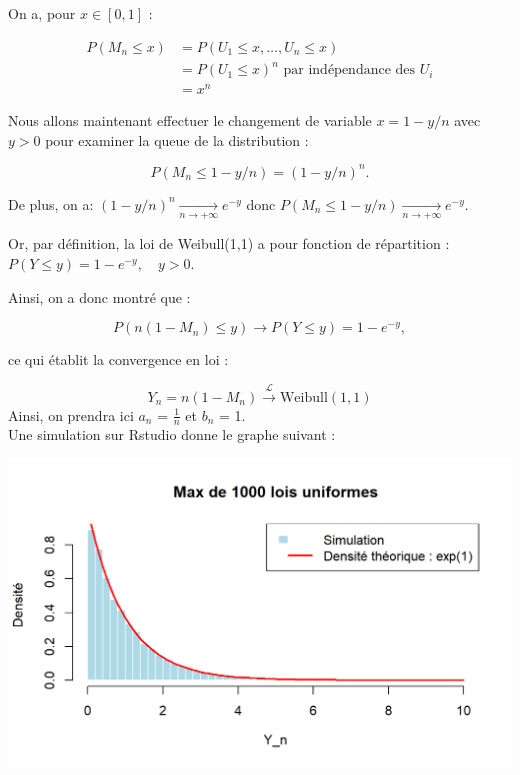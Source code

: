 \documentclass{article}
\theoremstyle{plain}
\theoremstyle{definition}
\theoremstyle{plain}
\begin{document}
\noindent On a, pour $ x \in [0,1]$ :

\begin{align*}
	P(M_n \leq x) &= P(U_1 \leq x, \dots, U_n \leq x) \\
	&= P(U_1 \leq x)^n \text{ par indépendance des $U_i$}\\
	&= x^n
\end{align*}

\noindent Nous allons maintenant effectuer le changement de variable $ x = 1 - y/n $ avec $y > 0 $ pour examiner la queue de la distribution :

\[
P(M_n \leq 1 - y/n) = (1 - y/n)^n.
\]

\noindent De plus, on a: $(1 - y/n)^n \xrightarrow[n \to +\infty]{} e^{-y} $ donc $ P(M_n \leq 1 - y/n) \xrightarrow[n \to +\infty]{} e^{-y} $.


\noindent Or, par définition, la loi de Weibull(1,1) a pour fonction de répartition : $ P(Y \leq y) = 1 - e^{-y}, \quad y > 0. $

\noindent Ainsi, on a donc montré que :

\[
P(n(1 - M_n) \leq y) \to P(Y \leq y) = 1 - e^{-y},
\]

\noindent ce qui établit la convergence en loi :

\[
Y_n = n(1 - M_n) \xrightarrow{\mathcal{L}} \text{Weibull}(1,1)
\] 
\noindent Ainsi, on prendra ici $a_n$ = $\frac{1}{n}$ et $b_n$ = 1. \\

\noindent Une simulation sur Rstudio donne le graphe suivant :

\begin{center}
	\includegraphics[scale=0.8]{./images/Max_Uniforme.png} 
\end{center}
\end{document}
